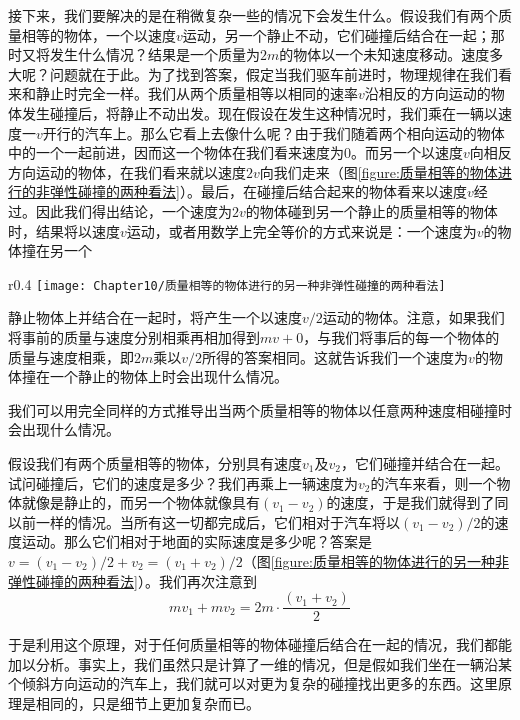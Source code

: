 接下来，我们要解决的是在稍微复杂一些的情况下会发生什么。假设我们有两个质量相等的物体，一个以速度$v$运动，另一个静止不动，它们碰撞后结合在一起；那时又将发生什么情况？结果是一个质量为$2m$的物体以一个未知速度移动。速度多大呢？问题就在于此。为了找到答案，假定当我们驱车前进时，物理规律在我们看来和静止时完全一样。我们从两个质量相等以相同的速率$v$沿相反的方向运动的物体发生碰撞后，将静止不动出发。现在假设在发生这种情况时，我们乘在一辆以速度一$v$开行的汽车上。那么它看上去像什么呢？由于我们随着两个相向运动的物体中的一个一起前进，因而这一个物体在我们看来速度为0。而另一个以速度$v$向相反方向运动的物体，在我们看来就以速度$2v$向我们走来（图\ref{figure:质量相等的物体进行的非弹性碰撞的两种看法}）。最后，在碰撞后结合起来的物体看来以速度$v$经过。因此我们得出结论，一个速度为$2v$的物体碰到另一个静止的质量相等的物体时，结果将以速度$v$运动，或者用数学上完全等价的方式来说是：一个速度为$v$的物体撞在另一个
\begin{wrapfigure}{r}{0.4\textwidth}
    \centering
    \texttt{[image: Chapter10/质量相等的物体进行的另一种非弹性碰撞的两种看法]}
    \caption{质量相等的物体进行的另一种非弹性碰撞的两种看法}
    \label{figure:质量相等的物体进行的另一种非弹性碰撞的两种看法}
\end{wrapfigure}
静止物体上并结合在一起时，将产生一个以速度$v/2$运动的物体。注意，如果我们将事前的质量与速度分别相乘再相加得到$mv+0$，与我们将事后的每一个物体的质量与速度相乘，即$2m$乘以$v/2$所得的答案相同。这就告诉我们一个速度为$v$的物体撞在一个静止的物体上时会出现什么情况。

我们可以用完全同样的方式推导出当两个质量相等的物体以任意两种速度相碰撞时会出现什么情况。

假设我们有两个质量相等的物体，分别具有速度$v_1$及$v_2$，它们碰撞并结合在一起。试问碰撞后，它们的速度是多少？我们再乘上一辆速度为$v_2$的汽车来看，则一个物体就像是静止的，而另一个物体就像具有$(v_1-v_2)$的速度，于是我们就得到了同以前一样的情况。当所有这一切都完成后，它们相对于汽车将以$(v_1-v_2)/2$的速度运动。那么它们相对于地面的实际速度是多少呢？答案是$v=(v_1-v_2)/2+v_2=(v_1+v_2)/2$（图\ref{figure:质量相等的物体进行的另一种非弹性碰撞的两种看法}）。我们再次注意到
\begin{equation}
    \label{Eq:I:10:6}
    mv_1+mv_2=2m \cdot \frac{(v_1+v_2)}{2}
\end{equation}

于是利用这个原理，对于任何质量相等的物体碰撞后结合在一起的情况，我们都能加以分析。事实上，我们虽然只是计算了一维的情况，但是假如我们坐在一辆沿某个倾斜方向运动的汽车上，我们就可以对更为复杂的碰撞找出更多的东西。这里原理是相同的，只是细节上更加复杂而已。

